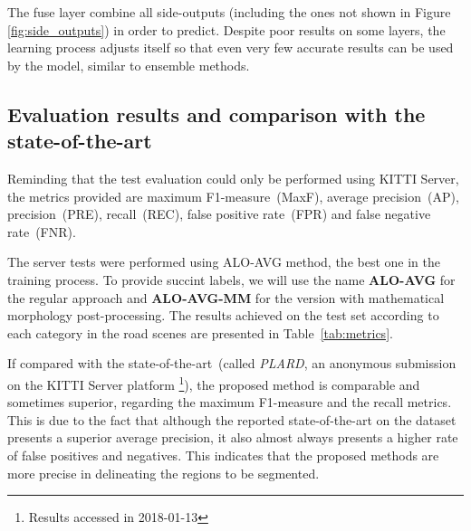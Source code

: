 The fuse layer combine all side-outputs (including the ones not shown in Figure \ref{fig:side_outputs}) in order to predict. Despite poor results on some layers, the learning process adjusts itself so that even very few accurate results can be used by the model, similar to ensemble methods.

   

\subsection{Evaluation results and comparison with the state-of-the-art}

Reminding that the test evaluation could only be performed using KITTI Server, the metrics provided are maximum F1-measure~(MaxF), average precision~(AP), precision~(PRE), recall~(REC), false positive rate~(FPR) and false negative rate~(FNR). 

The server tests were performed using ALO-AVG method, the best one in the training process. To provide succint labels, we will use the name \textbf{ALO-AVG} for the regular approach and \textbf{ALO-AVG-MM} for the version with mathematical morphology post-processing. The results achieved  on the test set according to each category in the road scenes are presented in Table~\ref{tab:metrics}. 

If compared with the state-of-the-art~(called \textit{PLARD}, an anonymous submission on the KITTI Server platform \footnote{Results accessed in 2018-01-13}), the proposed method is comparable and sometimes superior, regarding the maximum F1-measure and the recall metrics. This is due to the fact that although the reported state-of-the-art on the dataset presents a superior average precision, it also almost always presents a higher rate of false positives and negatives. This indicates that the proposed methods are more precise in delineating the regions to be segmented.

